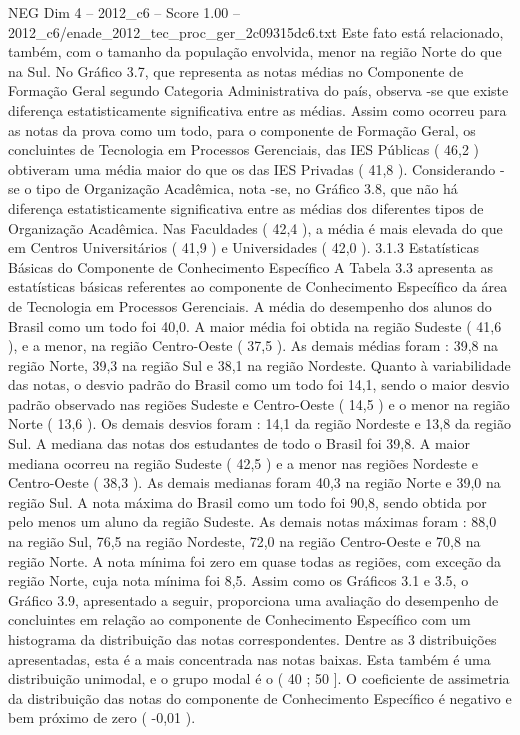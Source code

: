 \begin{textsample}{NEG Dim 4 – 2012\_c6 – Score 1.00 – 2012\_c6/enade\_2012\_tec\_proc\_ger\_2c09315dc6.txt}
Este fato está relacionado, também, com o tamanho da população envolvida, menor na região Norte do que na Sul.
No Gráfico 3.7, que representa as notas médias no Componente de Formação Geral segundo Categoria Administrativa do país, observa -se que existe diferença estatisticamente significativa entre as médias.
Assim como ocorreu para as notas da prova como um todo, para o componente de Formação Geral, os concluintes de Tecnologia em Processos Gerenciais, das IES Públicas ( 46,2 ) obtiveram uma média maior do que os das IES Privadas ( 41,8 ).
Considerando -se o tipo de Organização Acadêmica, nota -se, no Gráfico 3.8, que não há diferença estatisticamente significativa entre as médias dos diferentes tipos de Organização Acadêmica.
Nas Faculdades ( 42,4 ), a média é mais elevada do que em Centros Universitários ( 41,9 ) e Universidades ( 42,0 ). 3.1.3 Estatísticas Básicas do Componente de Conhecimento Específico A Tabela 3.3 apresenta as estatísticas básicas referentes ao componente de Conhecimento Específico da área de Tecnologia em Processos Gerenciais.
A média do desempenho dos alunos do Brasil como um todo foi 40,0.
A maior média foi obtida na região Sudeste ( 41,6 ), e a menor, na região Centro-Oeste ( 37,5 ).
As demais médias foram : 39,8 na região Norte, 39,3 na região Sul e 38,1 na região Nordeste.
Quanto à variabilidade das notas, o desvio padrão do Brasil como um todo foi 14,1, sendo o maior desvio padrão observado nas regiões Sudeste e Centro-Oeste ( 14,5 ) e o menor na região Norte ( 13,6 ).
Os demais desvios foram : 14,1 da região Nordeste e 13,8 da região Sul.
A mediana das notas dos estudantes de todo o Brasil foi 39,8.
A maior mediana ocorreu na região Sudeste ( 42,5 ) e a menor nas regiões Nordeste e Centro-Oeste ( 38,3 ).
As demais medianas foram 40,3 na região Norte e 39,0 na região Sul.
A nota máxima do Brasil como um todo foi 90,8, sendo obtida por pelo menos um aluno da região Sudeste.
As demais notas máximas foram : 88,0 na região Sul, 76,5 na região Nordeste, 72,0 na região Centro-Oeste e 70,8 na região Norte.
A nota mínima foi zero em quase todas as regiões, com exceção da região Norte, cuja nota mínima foi 8,5.
Assim como os Gráficos 3.1 e 3.5, o Gráfico 3.9, apresentado a seguir, proporciona uma avaliação do desempenho de concluintes em relação ao componente de Conhecimento Específico com um histograma da distribuição das notas correspondentes.
Dentre as 3 distribuições apresentadas, esta é a mais concentrada nas notas baixas.
Esta também é uma distribuição unimodal, e o grupo modal é o ( 40 ; 50 ].
O coeficiente de assimetria da distribuição das notas do componente de Conhecimento Específico é negativo e bem próximo de zero ( -0,01 ).

\end{textsample}
